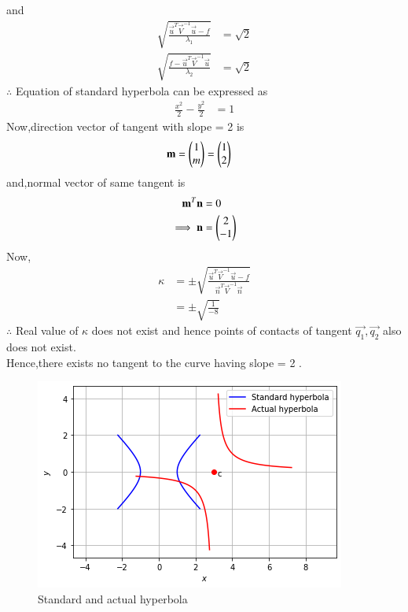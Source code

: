 \documentclass[journal,12pt,twocolumn]{IEEEtran}
\begin{document}
and
\begin{align}
    \sqrt{\frac{ \vec{u}^T\vec{V}^{-1}\vec{u} - f}{\lambda_1}} &= \sqrt{2}
    \\
    \sqrt{ \frac{f- \vec{u}^T\vec{V}^{-1}\vec{u}}{\lambda_2}} &= \sqrt{2}
\end{align}
$\therefore$ Equation of standard hyperbola can be expressed as 
\begin{align}
    \frac{x^2}{2} - \frac{y^2}{2} &= 1
\end{align}
Now,direction vector of tangent with slope = 2 is
\begin{align}
    \mathbf{m} &= \begin{pmatrix}1 \\ m\end{pmatrix} = \begin{pmatrix}1 \\ 2\end{pmatrix}
\end{align}
and,normal vector of same tangent is 
\begin{align}
    \mathbf{m}^T\mathbf{n} &= 0
    \\
    \implies \mathbf{n} &= \begin{pmatrix}2 \\ -1\end{pmatrix} 
\end{align}
Now,
\begin{align}
    \kappa &= \pm \sqrt{\frac{\vec{u}^T\vec{V}^{-1}\vec{u}-f}{\vec{n}^T\vec{V}^{-1}\vec{n}}}
    \\
    &= \pm \sqrt{\frac{1}{-8}}
\end{align}
$\therefore$ Real value of $\kappa$ does not exist and hence points of contacts of tangent $\vec{q_1},\vec{q_2}$ also does not exist.
\\
Hence,there exists no tangent to the curve having slope = 2 .

\begin{figure}[!ht]
\centering
\includegraphics[width=\columnwidth]{Figure8}
\caption{Standard and actual hyperbola}
\label{fig:hyperbola}	
\end{figure}
\end{document}
